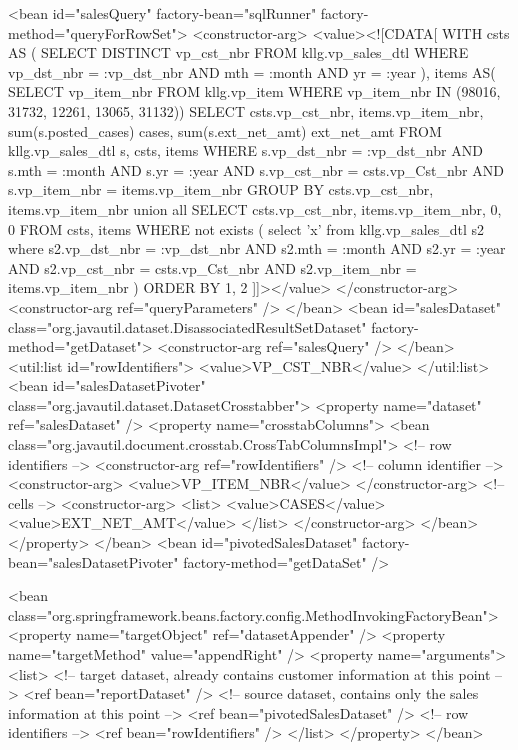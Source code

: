 \documentclass[letterpaper,10pt]{article}
\begin{document}
\begin{verbatimtab}
<bean id="salesQuery" factory-bean="sqlRunner" factory-method="queryForRowSet">
	<constructor-arg>
		<value><![CDATA[ 
	WITH csts AS ( 
	SELECT	DISTINCT vp_cst_nbr 
	FROM	kllg.vp_sales_dtl 
	WHERE	vp_dst_nbr		=	:vp_dst_nbr 
	AND	mth				=	:month 
	AND	yr				=	:year ), 
	items AS( 
	SELECT	vp_item_nbr 
	FROM	kllg.vp_item 
	WHERE	vp_item_nbr IN (98016, 31732, 12261, 13065, 31132)) 
	SELECT	csts.vp_cst_nbr,  
	items.vp_item_nbr,  
	sum(s.posted_cases) cases,  
	sum(s.ext_net_amt) ext_net_amt  
	FROM 
	kllg.vp_sales_dtl		s, 
	csts, 
	items 
	WHERE	 
		s.vp_dst_nbr		=	:vp_dst_nbr 
 	AND	s.mth				=	:month 
 	AND	s.yr				=	:year 
 	AND s.vp_cst_nbr        =   csts.vp_Cst_nbr 
 	AND s.vp_item_nbr       =   items.vp_item_nbr 
	GROUP BY csts.vp_cst_nbr, 
		 items.vp_item_nbr 
	union all 
	SELECT	csts.vp_cst_nbr,  
	items.vp_item_nbr,  
	0, 0   
	FROM
	csts, 
	items 
	WHERE	 
        not exists ( 
        select  'x' 
        from    kllg.vp_sales_dtl    s2 
        where	s2.vp_dst_nbr		=	:vp_dst_nbr 
       	AND	s2.mth				=	:month 
       	AND	s2.yr				=	:year 
       	AND s2.vp_cst_nbr       =   csts.vp_Cst_nbr 
       	AND s2.vp_item_nbr      =   items.vp_item_nbr ) 
	ORDER BY 1, 2
	]]></value>
	</constructor-arg>
	<constructor-arg ref="queryParameters" />
</bean>
<bean id="salesDataset" class="org.javautil.dataset.DisassociatedResultSetDataset"
	factory-method="getDataset">
	<constructor-arg ref="salesQuery" />
</bean>
<util:list id="rowIdentifiers">
	<value>VP_CST_NBR</value>
</util:list>
<bean id="salesDatasetPivoter" class="org.javautil.dataset.DatasetCrosstabber">
	<property name="dataset" ref="salesDataset" />
	<property name="crosstabColumns">
		<bean class="org.javautil.document.crosstab.CrossTabColumnsImpl">
			<!-- row identifiers -->
			<constructor-arg ref="rowIdentifiers" />
			<!-- column identifier -->
			<constructor-arg>
				<value>VP_ITEM_NBR</value>
			</constructor-arg>
			<!-- cells -->
			<constructor-arg>
				<list>
					<value>CASES</value>
					<value>EXT_NET_AMT</value>
				</list>
			</constructor-arg>
		</bean>
	</property>
</bean>
<bean id="pivotedSalesDataset" factory-bean="salesDatasetPivoter"
	factory-method="getDataSet" />

<bean class="org.springframework.beans.factory.config.MethodInvokingFactoryBean">
	<property name="targetObject" ref="datasetAppender" />
	<property name="targetMethod" value="appendRight" />
	<property name="arguments">
		<list>
			<!-- target dataset, already contains customer information at this point -->
			<ref bean="reportDataset" />
			<!-- source dataset, contains only the sales information at this point -->
			<ref bean="pivotedSalesDataset" />
			<!-- row identifiers -->
			<ref bean="rowIdentifiers" />
		</list>
	</property>
</bean>


\end{verbatimtab}
\end{document}
